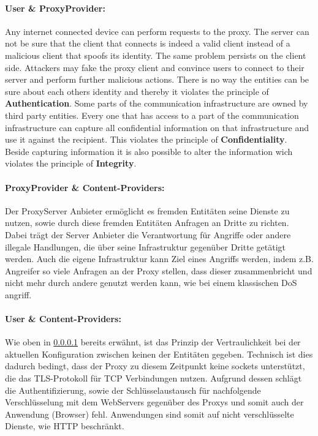 \documentclass[12pt, a4paper]{scrartcl}
\begin{document}
\paragraph{User \& ProxyProvider:}\label{ssec::user}
\noindent Any internet connected device can perform requests to the proxy. The server can not be sure that the client that connects is indeed a valid client instead of a malicious client that spoofs its identity. The same problem persists on the client side. Attackers may fake the proxy client and convince users to connect to their server and perform further malicious actions. There is no way the entities can be sure about each others identity and thereby it violates the principle of \textbf{Authentication}.\newline
Some parts of the communication infrastructure are owned by third party entities. Every one that has access to a part of the communication infrastructure can capture all confidential information on that infrastructure and use it against the recipient. This violates the principle of \textbf{Confidentiality}.\newline
Beside capturing information it is also possible to alter the information wich violates the principle of \textbf{Integrity}.
\paragraph{ProxyProvider \& Content-Providers:}
Der ProxyServer Anbieter ermöglicht es fremden Entitäten seine Dienste zu nutzen, sowie durch diese fremden Entitäten Anfragen an Dritte zu richten. Dabei trägt der Server Anbieter die Verantwortung für Angriffe oder andere illegale Handlungen, die über seine Infrastruktur gegenüber Dritte getätigt werden.\newline
Auch die eigene Infrastruktur kann Ziel eines Angriffs werden, indem z.B. Angreifer so viele Anfragen an der Proxy stellen, dass dieser zusammenbricht und nicht mehr durch andere genutzt werden kann, wie bei einem klassischen \ac{DoS} angriff.
\paragraph{User \& Content-Providers:}
Wie oben in \ref{ssec::user} bereits erwähnt, ist das Prinzip der Vertraulichkeit bei der aktuellen Konfiguration zwischen keinen der Entitäten gegeben. Technisch ist dies dadurch bedingt, dass der Proxy zu diesem Zeitpunkt keine sockets unterstützt, die das \ac{TLS}-Protokoll für TCP Verbindungen nutzen. Aufgrund dessen schlägt die Authentifizierung, sowie der Schlüsselaustausch für nachfolgende Verschlüsselung mit dem WebServers gegenüber des Proxys und somit auch der Anwendung (Browser) fehl. Anwendungen sind somit auf nicht verschlüsselte Dienste, wie \acs{HTTP} beschränkt.
\end{document}
